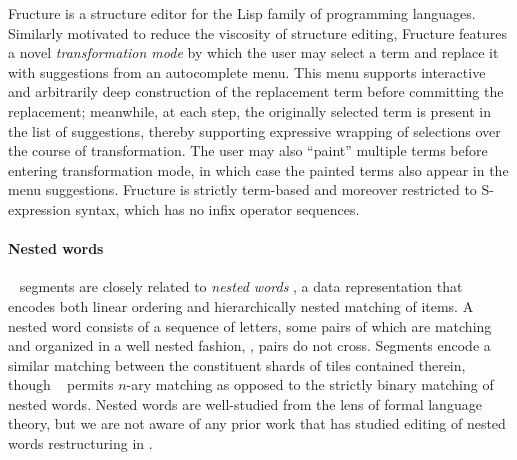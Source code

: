 
Fructure \cite{fructure} is a structure editor for the Lisp family of
programming languages.
Similarly motivated to reduce the viscosity of structure
editing, Fructure features a novel \emph{transformation mode}
by which the user may select a term
and replace it with suggestions from an autocomplete menu.
This menu supports interactive and arbitrarily deep
construction of the replacement term before committing
the replacement; meanwhile, at each
step, the originally selected term is present in the
list of suggestions, thereby supporting expressive
wrapping of selections over the course of transformation.
The user may also ``paint'' multiple terms before
entering transformation mode, in which case the painted
terms also appear in the menu suggestions.
Fructure is strictly term-based and moreover restricted
to S-expression syntax, which has no infix operator sequences.



\paragraph{Nested words}
\ty~ segments are closely related to \emph{nested words}
\cite{nested-words},
a data representation that encodes both linear
ordering and hierarchically nested matching
of items.
A nested word consists of a sequence of letters,
some pairs of which are matching and organized
in a well nested fashion, \ie, pairs do not cross.
Segments encode a similar matching between the
constituent shards of tiles contained therein,
though \ty~ permits $n$-ary matching as opposed
to the strictly binary matching of nested words.
Nested words are well-studied from the lens of
formal language theory, but we are not aware of
any prior work that has studied editing of nested words
\ala restructuring in \tylr.

